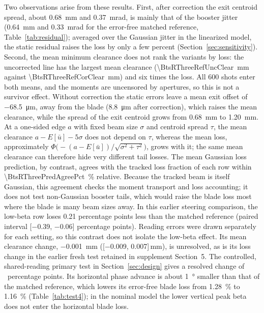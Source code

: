 \documentclass[final,5p,twocolumn]{elsarticle}
\begin{document}
Two observations arise from these results. First, after correction the exit
centroid spread, about \SI{0.68}{\milli\metre} and \SI{0.37}{\milli\radian}, is mainly that of the booster jitter
(\SI{0.64}{\milli\metre} and \SI{0.33}{\milli\radian} for the error-free matched reference,
Table~\ref{tab:residual}); averaged over the Gaussian jitter in the linearized model, the
static residual raises the loss by only a few percent (Section~\ref{sec:sensitivity}). Second, the mean
minimum clearance does not rank the variants by loss: the uncorrected line has the
largest mean clearance (\SI{\BtsRThreeRefUncClear}{\milli\metre} against \SI{\BtsRThreeRefCorClear}{\milli\metre})
and six times the loss. All 600 shots enter both means, and the moments are
uncensored by apertures, so this is not a survivor effect. Without correction the
static errors leave a mean exit offset of \SI{-68.5}{\micro\metre}, away from the blade
(\SI{+8.8}{\micro\metre} after correction), which raises the mean clearance, while the spread
of the exit centroid grows from \SI{0.68}{\milli\metre} to \SI{1.20}{\milli\metre}. At a one-sided edge $a$ with
fixed beam size $\sigma$ and centroid spread $\tau$, the mean clearance
$a-E[\bar u]-5\sigma$ does not depend on $\tau$, whereas the mean loss,
approximately $\Phi\bigl(-(a-E[\bar u])/\sqrt{\sigma^2+\tau^2}\bigr)$, grows with it; the same
mean clearance can therefore hide very different tail losses. The mean Gaussian loss prediction, by
contrast, agrees with the tracked loss fraction of each row within
\SI{\BtsRThreePredAgreePct}{\percent} relative. Because the tracked beam is
itself Gaussian, this agreement checks the moment transport and loss accounting; it
does not test non-Gaussian booster tails, which would raise the blade loss most
where the blade is many beam sizes away. In this earlier steering comparison,
the low-beta row loses \num{0.21} percentage points less than the matched reference
(paired interval [\num{-0.39}, \num{-0.06}] percentage points). Reading errors were
drawn separately for each setting, so this contrast does not isolate the low-beta
effect. Its mean clearance change, \SI{-0.001}{\milli\metre}
([\num{-0.009}, \num{+0.007}]\,\si{\milli\metre}), is unresolved, as is its loss change
in the earlier fresh test retained in supplement Section~5. The controlled,
shared-reading primary test in Section~\ref{sec:design} gives a resolved change of
\BtsRFiveDiffLow\ percentage points. Its horizontal phase
advance is about \SI{1}{\degree} smaller than that of the matched reference, which lowers its
error-free blade loss from \SI{1.28}{\percent} to \SI{1.16}{\percent} (Table~\ref{tab:test4}); in the nominal
model the lower vertical peak beta does not enter the horizontal blade loss.
\end{document}
